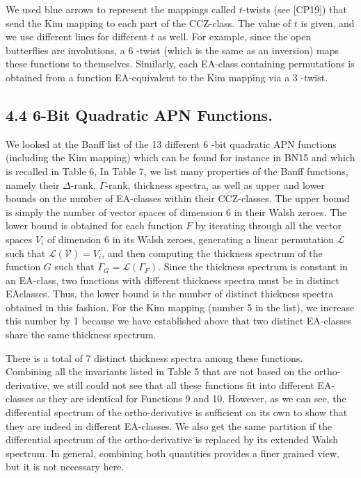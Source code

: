 \documentclass[10pt]{article}
\begin{document}
We used blue arrows to represent the mappings called $t$-twists (see [CP19]) that send the Kim mapping to each part of the CCZ-class. The value of $t$ is given, and we use different lines for different $t$ as well. For example, since the open butterflies are involutions, a 6 -twist (which is the same as an inversion) maps these functions to themselves. Similarly, each EA-class containing permutations is obtained from a function EA-equivalent to the Kim mapping via a 3 -twist.

\subsection*{4.4 6-Bit Quadratic APN Functions.}
We looked at the Banff list of the 13 different 6 -bit quadratic APN functions (including the Kim mapping) which can be found for instance in BN15 and which is recalled in Table 6, In Table 7, we list many properties of the Banff functions, namely their $\Delta$-rank, $\Gamma$-rank, thickness spectra, as well as upper and lower bounds on the number of EA-classes within their CCZ-classes. The upper bound is simply the number of vector spaces of dimension 6 in their Walsh zeroes. The lower bound is obtained for each function $F$ by iterating through all the vector spaces $V_{i}$ of dimension 6 in its Walsh zeroes, generating a linear permutation $\mathcal{L}$ such that $\mathcal{L}(\mathcal{V})=V_{i}$, and then computing the thickness spectrum of the function $G$ such that $\Gamma_{G}=\mathcal{L}\left(\Gamma_{F}\right)$. Since the thickness spectrum is constant in an EA-class, two functions with different thickness spectra must be in distinct EAclasses. Thus, the lower bound is the number of distinct thickness spectra obtained in this fashion. For the Kim mapping (number 5 in the list), we increase this number by 1 because we have established above that two distinct EA-classes share the same thickness spectrum.

There is a total of 7 distinct thickness spectra among these functions.\\
Combining all the invariants listed in Table 5 that are not based on the ortho-derivative, we still could not see that all these functions fit into different EA-classes as they are identical for Functions 9 and 10. However, as we can see, the differential spectrum of the ortho-derivative is sufficient on its own to show that they are indeed in different EA-classes. We also get the same partition if the differential spectrum of the ortho-derivative is replaced by its extended Walsh spectrum. In general, combining both quantities provides a finer grained view, but it is not necessary here.
\end{document}

